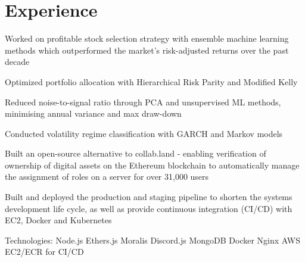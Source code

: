 \documentclass[]{deedy-resume-openfont}
\begin{document}
\hfill
\begin{minipage}[t]{0.66\textwidth} 


\section{Experience}
\subtitle{March 2022 - July 2022 | Singapore}
\vspace{\topsep} %
\begin{tightemize}
\item Worked on profitable stock selection strategy with ensemble machine learning methods which outperformed the market’s risk-adjusted returns over the past decade
\item Optimized portfolio allocation with Hierarchical Risk Parity and Modified Kelly
\item Reduced noise-to-signal ratio through PCA and unsupervised ML methods, minimising annual variance and max draw-down
\item Conducted volatility regime classification with GARCH and Markov models
\end{tightemize}
\sectionsep

\subtitle{April 2022 – July 2022 | Singapore}
\begin{tightemize}
\item Built an open-source alternative to collab.land - enabling verification of ownership of digital assets on the Ethereum blockchain to automatically manage the assignment of roles on a server for over 31,000 users
\item Built and deployed the production and staging pipeline to shorten the systems development life cycle, as well as provide continuous integration (CI/CD) with EC2, Docker and Kubernetes
\item Technologies: Node.js \textbullet{} Ethers.js \textbullet{} Moralis \textbullet{} Discord.js \textbullet{} MongoDB \textbullet{} Docker \textbullet{} Nginx \textbullet{} AWS EC2/ECR for CI/CD
\end{tightemize}
\sectionsep


\end{minipage}
\end{document}
